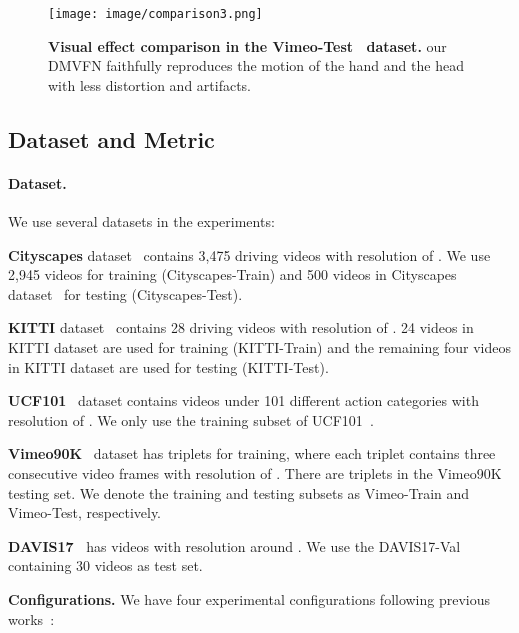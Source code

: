 \documentclass[10pt,twocolumn,letterpaper]{article}
\begin{document}
 \begin{figure}[th]
 	\centering
 	\texttt{[image: image/comparison3.png]}
 	\caption{\textbf{Visual effect comparison in the Vimeo-Test~\cite{vimeo} dataset.} our DMVFN faithfully reproduces the motion of the hand and the head with less distortion and artifacts.}
 	\label{fig:Vimeo}
    \vspace{-1em}
\end{figure}



\subsection{Dataset and Metric}
\label{sec:dataset}
\paragraph{Dataset.} We use several datasets in the experiments:

\vspace{0.4em}
\noindent \textbf{Cityscapes} dataset~\cite{cityscapes} contains 3,475 driving videos with resolution of . We use 2,945 videos for training (Cityscapes-Train) and 500 videos in Cityscapes dataset~\cite{cityscapes} for testing (Cityscapes-Test).

\vspace{0.4em}
\noindent \textbf{KITTI} dataset~\cite{kitti} contains 28 driving videos with resolution of . 24 videos in KITTI dataset are used for training (KITTI-Train) and the remaining four videos in KITTI dataset are used for testing (KITTI-Test).

\vspace{0.4em}
\noindent \textbf{UCF101}~\cite{ucf101} dataset contains  videos under 101 different action categories with resolution of . We only use the training subset of UCF101~\cite{ucf101}.

\vspace{0.4em}
\noindent \textbf{Vimeo90K}~\cite{vimeo} dataset has  triplets for training, where each triplet contains three consecutive video frames with resolution of .
There are  triplets in the Vimeo90K testing set. We denote the training and testing subsets as Vimeo-Train and Vimeo-Test, respectively.

\vspace{0.4em}
\noindent
\textbf{DAVIS17~\cite{davis}} has videos with resolution around . We use the DAVIS17-Val containing 30 videos as test set.

\noindent
\textbf{Configurations.} We have four experimental configurations following previous works~\cite{dyan,dvf,wu2022optimizing}:
\end{document}

